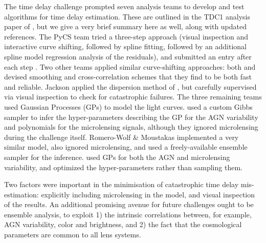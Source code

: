 The time delay challenge prompted seven analysis teams to develop and
test algorithms for time delay estimation. These are outlined in the
TDC1 analysis paper of \citet{LiaoEtal2015}, but we give a very brief
summary here as well, along with updated references. The PyCS team tried
a three-step approach (visual inspection and interactive curve shifting,
followed by spline fitting, followed  by an additional spline model
regression analysis of the residuals), and submitted an entry after each
step \citep{BonvinEtal2016}. Two other teams applied similar
curve-shifting approaches: both \citet{A+S2015} and \citet{RK++2015}
devised smoothing and cross-correlation schemes that they find to be
both fast and reliable. Jackson applied the dispersion method of
\citet{Pelt++96}, but carefully supervised via visual inspection to
check for  catastrophic failures.  The three remaining teams used
Gaussian Processes (GPs) to model the light curves. \citet{TakEtal2016}
used a custom Gibbs sampler to infer the hyper-parameters describing the
GP for the AGN variability and polynomials for the microlensing signals,
although they ignored microlensing during the challenge itself.
Romero-Wolf \& Moustakas implemented a very similar model, also ignored
microlensing, and used a freely-available ensemble sampler for the
inference. \citet{H+L2014} used GPs for both the AGN and microlensing
variability, and optimized the hyper-parameters rather than sampling
them.

Two factors were important in the minimisation of catastrophic time
delay mis-estimation: explicitly including microlensing in the model,
and  visual inspection of the results. An additional promising avenue
for future challenges ought to be ensemble analysis, to exploit 1) the
intrinsic correlations between, for example, AGN variability, color and
brightness, and 2) the fact that  the cosmological parameters are common
to all lens systems.
